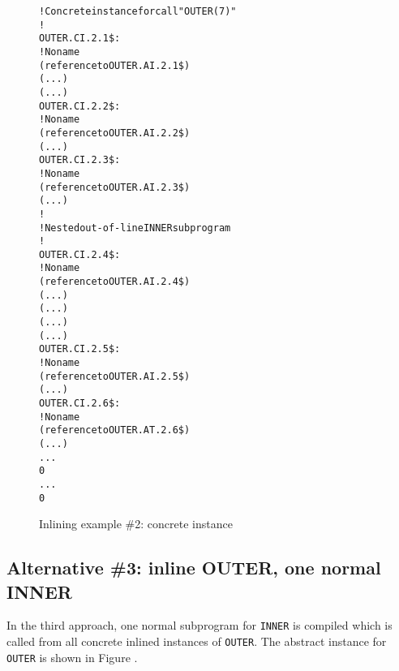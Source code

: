 \begin{figure}[t]
\begin{dwflisting}
\begin{alltt}

    ! Concrete instance for call "OUTER(7)"
    !
OUTER.CI.2.1\$:
    \DWTAGinlinedsubroutine
        ! No name
        \DWATabstractorigin(reference to OUTER.AI.2.1\$)
        \DWATlowpc(...)
        \DWAThighpc(...)
OUTER.CI.2.2\$:
        \DWTAGformalparameter
            ! No name
            \DWATabstractorigin(reference to OUTER.AI.2.2\$)
            \DWATlocation(...)
OUTER.CI.2.3\$:
        \DWTAGvariable
            ! No name
            \DWATabstractorigin(reference to OUTER.AI.2.3\$)
            \DWATlocation(...)
        !
        ! Nested out-of-line INNER subprogram
        !
OUTER.CI.2.4\$:
        \DWTAGsubprogram
            ! No name
            \DWATabstractorigin(reference to OUTER.AI.2.4\$)
            \DWATlowpc(...)
            \DWAThighpc(...)
            \DWATframebase(...)
            \DWATstaticlink(...)
OUTER.CI.2.5\$:
            \DWTAGformalparameter
                ! No name
                \DWATabstractorigin(reference to OUTER.AI.2.5\$)
                \DWATlocation(...)
OUTER.CI.2.6\$:
            \DWTAGvariable
                ! No name
                \DWATabstractorigin(reference to OUTER.AT.2.6\$)
                \DWATlocation(...)
            ...
            0
        ...
        0
\end{alltt}
\end{dwflisting}
\caption{Inlining example \#2: concrete instance}
\label{fig:inliningexample2concreteinstance}
\end{figure}

\subsection{Alternative \#3: inline OUTER, one normal INNER}
\label{app:inlineouteronenormalinner}

In the third approach, one normal subprogram for \texttt{INNER} is
compiled which is called from all concrete inlined instances of
\texttt{OUTER}. The abstract instance for \texttt{OUTER} is shown in 
Figure .

